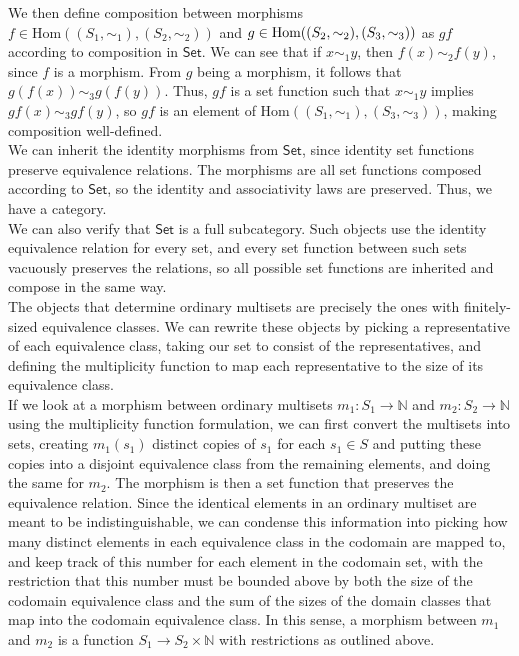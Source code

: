 We then define composition between morphisms $f \in \text{Hom}((S_1, \sim_1), (S_2, \sim_2))$ and $g \in \\ \text{Hom}((S_2, \sim_2), (S_3, \sim_3))$ as $gf$ according to composition in $\textsf{Set}$. We can see that if $x \sim_1 y$, then $f(x) \sim_2 f(y)$, since $f$ is a morphism. From $g$ being a morphism, it follows that $g(f(x)) \sim_3 g(f(y))$. Thus, $gf$ is a set function such that $x \sim_1 y$ implies $gf(x) \sim_3 gf(y)$, so $gf$ is an element of $\text{Hom}((S_1, \sim_1), (S_3, \sim_3))$, making composition well-defined. \\

We can inherit the identity morphisms from $\textsf{Set}$, since identity set functions preserve equivalence relations. The morphisms are all set functions composed according to $\textsf{Set}$, so the identity and associativity laws are preserved. Thus, we have a category. \\

We can also verify that $\textsf{Set}$ is a full subcategory. Such objects use the identity equivalence relation for every set, and every set function between such sets vacuously preserves the relations, so all possible set functions are inherited and compose in the same way. \\

The objects that determine ordinary multisets are precisely the ones with finitely-sized equivalence classes. We can rewrite these objects by picking a representative of each equivalence class, taking our set to consist of the representatives, and defining the multiplicity function to map each representative to the size of its equivalence class. \\

If we look at a morphism between ordinary multisets $m_1 :S_1 \to \mathbb{N}$ and $m_2 : S_2 \to \mathbb{N}$ using the multiplicity function formulation, we can first convert the multisets into sets, creating $m_1 (s_1)$ distinct copies of $s_1$ for each $s_1 \in S$ and putting these copies into a disjoint equivalence class from the remaining elements, and doing the same for $m_2$. The morphism is then a set function that preserves the equivalence relation. Since the identical elements in an ordinary multiset are meant to be indistinguishable, we can condense this information into picking how many distinct elements in each equivalence class in the codomain are mapped to, and keep track of this number for each element in the codomain set, with the restriction that this number must be bounded above by both the size of the codomain equivalence class and the sum of the sizes of the domain classes that map into the codomain equivalence class. In this sense, a morphism between $m_1$ and $m_2$ is a function $S_1 \to S_2 \times \mathbb{N}$ with restrictions as outlined above.

